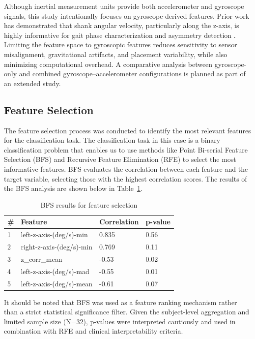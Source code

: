 Although inertial measurement units provide both accelerometer and gyroscope signals, this study intentionally focuses on gyroscope-derived features. Prior work
has demonstrated that shank angular velocity, particularly along the z-axis, is highly informative for gait phase characterization and asymmetry detection
\cite{ref36,ref38}. Limiting the feature space to gyroscopic features reduces sensitivity to sensor misalignment, gravitational artifacts, and placement
variability, while also minimizing computational overhead. A comparative analysis between gyroscope-only and combined gyroscope–accelerometer configurations is
planned as part of an extended study.


\subsection{Feature Selection}
The feature selection process was conducted to identify the most relevant features for the classification task. The classification task in this case is a binary 
classification problem that enables us to use methods like Point Bi-serial Feature Selection (BFS) and Recursive Feature Elimination (RFE) to select the most
informative features. BFS evaluates the correlation between each feature and the target variable, selecting those with the highest correlation scores. 
The results of the BFS analysis are shown below in Table~\ref{tab:bfs_results}.

\begin{table}[H]
    \centering
    \caption{BFS results for feature selection}
    \small
    \begin{tabularx}{\columnwidth}{l l X X}
        \hline
        \textbf{\#} & \textbf{Feature} & \textbf{Correlation} & \textbf{p-value} \\
        \hline
        1 & left-z-axis-(deg/s)-min   & 0.835 & 0.56   \\
        2 & right-z-axis-(deg/s)-min  & 0.769 & 0.11  \\
        3 & z\_corr\_mean             & -0.53 & 0.02    \\
        4 & left-z-axis-(deg/s)-mad   & -0.55 & 0.01     \\
        5 & left-z-axis-(deg/s)-mean  & -0.61 & 0.07    \\ 
        \hline
    \end{tabularx}
    \label{tab:bfs_results}
\end{table}

It should be noted that BFS was used as a feature ranking mechanism rather than a strict statistical significance filter. Given the subject-level aggregation 
and limited sample size (N=32), p-values were interpreted cautiously and used in combination with RFE and clinical interpretability criteria.

